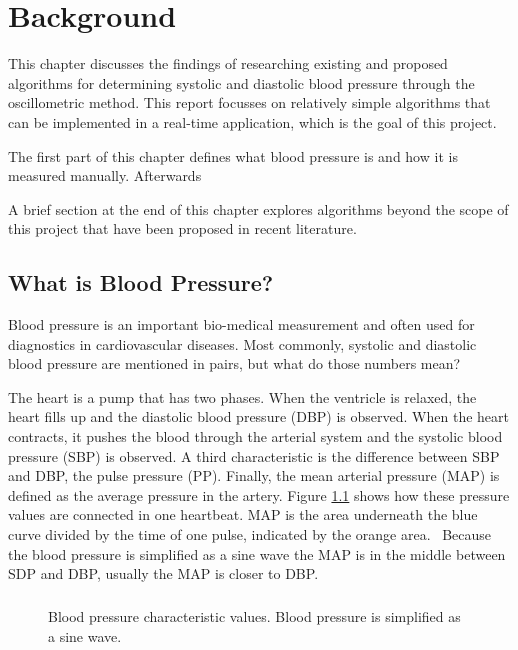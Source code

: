 \chapter{Background}\label{cp:theory}
This chapter discusses the findings of researching existing and proposed algorithms for determining systolic and diastolic blood pressure through the oscillometric method. This report focusses on relatively simple algorithms that can be implemented in a real-time application, which is the goal of this project.

The first part of this chapter defines what blood pressure is and how it is measured manually. Afterwards

A brief section at the end of this chapter explores algorithms beyond the scope of this project that have been proposed in recent literature.

\section{What is Blood Pressure?}
Blood pressure is an important bio-medical measurement and often used for diagnostics in cardiovascular diseases. Most commonly, systolic and diastolic blood pressure are mentioned in pairs, but what do those numbers mean?

The heart is a pump that has two phases. When the ventricle is relaxed, the heart fills up and the diastolic blood pressure (DBP) is observed. When the heart contracts, it pushes the blood through the arterial system and the systolic blood pressure (SBP) is observed. A third characteristic is the difference between SBP and DBP, the pulse pressure (PP). Finally, the mean arterial pressure (MAP) is defined as the average pressure in the artery. Figure \ref{fig:BP} shows how these pressure values are connected in one heartbeat. MAP is the area underneath the blue curve divided by the time of one pulse, indicated by the orange area. \cite{Boron2012}\ Because the blood pressure is simplified as a sine wave the MAP is in the middle between SDP and DBP, usually the MAP is closer to DBP. \paragraph{}

\begin{figure}[ht]
\centering
\caption{Blood pressure characteristic values. Blood pressure is simplified as a sine wave.} %
\label{fig:BP}
\end{figure}


